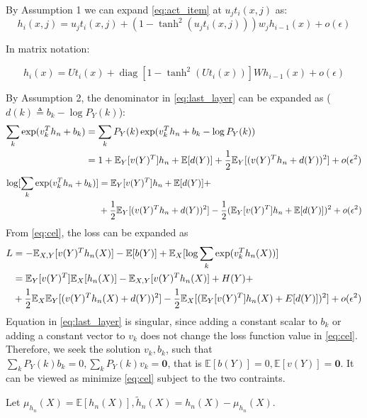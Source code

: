\documentclass{article}
\def\E{\mathbb{E}}
\DeclareMathOperator\diag{diag}
\begin{document}
By Assumption 1 we can expand \eqref{eq:act_item} 
at $u_j t_i(x,j)$ as:
$$
h_i(x,j) = u_j t_i(x,j) + (1-\tanh^2(u_j t_i(x,j)))w_j h_{i-1}(x) + o(\epsilon)
$$

In matrix notation:

$$
h_i(x)=Ut_i(x)+\diag[1-\tanh^2(Ut_i(x))]Wh_{i-1}(x)+o(\epsilon)
$$

By Assumption 2, the denominator in \eqref{eq:last_layer} can be expanded as ($d(k)\triangleq b_k-\log P_Y(k)$):
\begin{align*}
\sum_{k} \exp(v_k^T h_n + b_k) & = \sum_{k} P_Y(k) \exp(v_k^T h_n + b_k-\log P_Y(k))\\
& = 1 + \E_Y[v(Y)^T] h_n + \E[d(Y)] + {1\over 2}\E_Y[(v(Y)^T h_n+d(Y))^2] + o(\epsilon^2)
\end{align*}
\begin{equation*}
\begin{split}
\log [\sum_{k} \exp(v_k^T h_n + b_k)]  & =    \E_Y[v(Y)^T]h_n  + \E[d(Y)] +\\
& + {1\over 2}\E_Y[(v(Y)^T h_n + d(Y))^2] -{1\over 2}(\E_Y[v(Y)^T]h_n+\E[d(Y)])^2 + o(\epsilon^2)
\end{split}
\end{equation*}
From \eqref{eq:cel}, the loss can be expanded as
\begin{align*}
L & = -\E_{X,Y}[v(Y)^Th_n(X)] -\E[b(Y)]+ \E_X [\log \sum_{k} \exp(v_k^T h_n(X))] \\
& = \E_Y[v(Y)^T]\E_X[h_n(X)]-\E_{X,Y}[v(Y)^Th_n(X)] + H(Y) + \\
& +\frac{1}{2}\E_{X}\E_Y[(v(Y)^T h_n(X)+d(Y))^2]-{1\over 2}\E_X[(\E_Y[v(Y)^T]h_n(X)+E[d(Y)])^2] + o(\epsilon^2) \\
\end{align*}
Equation in \eqref{eq:last_layer} is singular, since adding a constant scalar to $b_k$ or adding a constant vector to $v_k$ does not change the loss function value in \eqref{eq:cel}.
Therefore, we seek the solution $v_k, b_k$, such that $\sum_{k}P_Y(k)b_k=0,\sum_{k}P_Y(k) v_k=\bm{0}$, that is $\E[b(Y)]=0,\E[v(Y)]=\bm{0}$. It can be viewed as minimize \eqref{eq:cel} subject to the two contraints. 

Let $\mu_{h_n}(X)=\E[h_n(X)],\tilde{h}_n(X)=h_n(X)-\mu_{h_n}(X)$.
\end{document}
